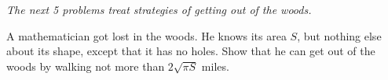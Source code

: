 \emph{The next 5 problems treat strategies of getting out of the woods.}

A mathematician got lost in the woods. He knows its area $S$, but nothing else about its shape, except that it has no holes. Show that he can get out of the woods by walking not more than $2\sqrt{\pi S}$ miles.
